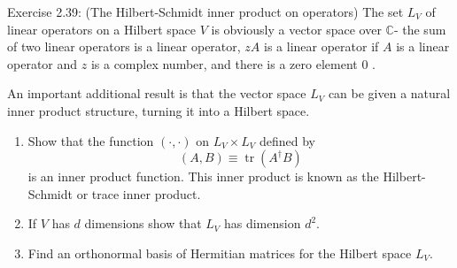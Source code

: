 \begin{exercise}
Exercise 2.39: (The Hilbert-Schmidt inner product on operators) The set $L_{V}$ of linear operators on a Hilbert space $V$ is obviously a vector space over $\mathbb{C}$- the sum of two linear operators is a linear operator, $z A$ is a linear operator if $A$ is a linear operator and $z$ is a complex number, and there is a zero element 0 . 

An important additional result is that the vector space $L_{V}$ can be given a natural inner product structure, turning it into a Hilbert space.
\begin{enumerate}
    \item Show that the function $(\cdot, \cdot)$ on $L_{V} \times L_{V}$ defined by
$$
(A, B) \equiv \operatorname{tr}\left(A^{\dagger} B\right)
$$
is an inner product function. This inner product is known as the Hilbert-Schmidt or trace inner product.
\item If $V$ has $d$ dimensions show that $L_{V}$ has dimension $d^{2}$.
\item Find an orthonormal basis of Hermitian matrices for the Hilbert space $L_{V}$.
\end{enumerate}
\end{exercise}
